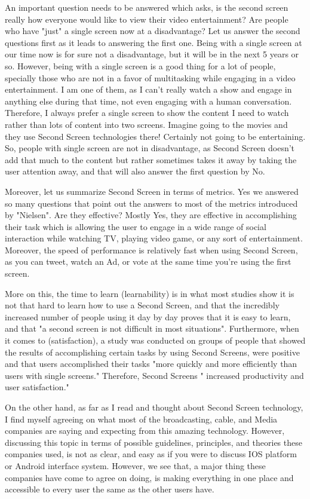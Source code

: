 \documentclass[12pt, oneside]{amsart}   	%
\begin{document}
  An important question needs to be answered which asks, is the second screen really how everyone would like to view their video entertainment? Are people who have "just" a single screen now at a disadvantage?  Let us answer the second questions first as it leads to answering the first one.  Being with a single screen at our time now is for sure not a disadvantage, but it will be in the next 5 years or so.  However, being with a single screen is a good thing for a lot of people, specially those who are not in a favor of multitasking while engaging in a video entertainment.  I am one of them, as I can't really watch a show and engage in anything else during that time, not even engaging with a human conversation. Therefore, I always prefer a single screen to show the content I need to watch rather than lots of content into two screens.  Imagine going to the movies and they use Second Screen technologies there! Certainly not going to be entertaining. So, people with single screen are not in disadvantage, as Second Screen doesn't add that much to the content but rather sometimes takes it away by taking the user attention away, and that will also answer the first question by No.
  
 Moreover, let us summarize Second Screen in terms of metrics.  Yes we answered so many questions that point out the answers to most of the metrics introduced by "Nielsen".  Are they effective? Mostly Yes, they are  effective in accomplishing their task which is allowing the user to engage in a wide range of social interaction while watching TV, playing video game, or any sort of entertainment.  Moreover, the speed of performance is relatively fast when using Second Screen, as you can tweet, watch an Ad, or vote at the same time you're using the first screen.
 
 More on this, the time to learn (learnability) is in what most studies show it is not that hard to learn how to use a  Second Screen, and that the incredibly increased number of people using it day by day proves that it is easy to learn, and that "a second screen is not difficult in most situations"\cite{AdvDisv}.  Furthermore, when it comes to (satisfaction), a study was conducted on groups of people that showed the results of accomplishing certain tasks by using Second Screens, were positive and that users accomplished their tasks "more quickly and more 
efficiently than users with single screens."\cite{Dell} Therefore, Second Screens " increased productivity and user satisfaction."\cite{Dell} 
 
 On the other hand, as far as I read and thought about Second Screen technology, I find myself agreeing on what most of the broadcasting, cable, and Media companies are saying and expecting from this amazing technology.  However, discussing this topic in terms of possible guidelines, principles, and theories these companies used, is not as clear, and easy as if you were to discuss IOS platform or Android interface system.  However, we see that, a major thing these companies have come to agree on doing, is making everything in one place and accessible to every user the same as the other users have.
\end{document}
